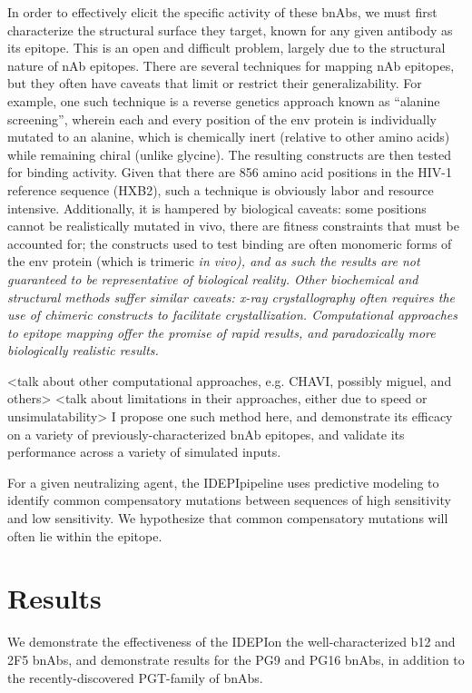 \documentclass[10pt]{article}
\newcommand{\idepi}{{IDEPI}}
\begin{document}
In order to effectively elicit the specific activity of these bnAbs,
we must first characterize the structural surface they target,
known for any given antibody as its epitope.
This is an open and difficult problem, largely due to the structural nature of nAb epitopes.
There are several techniques for mapping nAb epitopes, but they often have caveats that limit or restrict their generalizability.
For example, one such technique is a reverse genetics approach known as “alanine screening”,
wherein each and every position of the env protein is individually mutated to an alanine,
which is chemically inert (relative to other amino acids) while remaining chiral (unlike glycine).
The resulting constructs are then tested for binding activity.
Given that there are 856 amino acid positions in the HIV-1 reference sequence ({HXB2}),
such a technique is obviously labor and resource intensive.
Additionally, it is hampered by biological caveats: some positions cannot be realistically mutated in vivo,
there are fitness constraints that must be accounted for;
the constructs used to test binding are often monomeric forms of the env protein (which is trimeric \em{in vivo}),
and as such the results are not guaranteed to be representative of biological reality.
Other biochemical and structural methods suffer similar caveats:
x-ray crystallography often requires the use of chimeric constructs to facilitate crystallization.
Computational approaches to epitope mapping offer the promise of rapid results,
and paradoxically more biologically realistic results.

<talk about other computational approaches, e.g. CHAVI, possibly miguel, and others>
<talk about limitations in their approaches, either due to speed or unsimulatability> I propose one such method here, and demonstrate its efficacy on a variety of previously-characterized bnAb epitopes, and validate its performance across a variety of simulated inputs.

For a given neutralizing agent,
the \idepi pipeline uses predictive modeling to identify common compensatory mutations between sequences of high sensitivity and low sensitivity.
We hypothesize that common compensatory mutations will often lie within the epitope.

\section*{Results}

We demonstrate the effectiveness of the \idepi on the well-characterized b12 and 2F5 bnAbs,
and demonstrate results for the PG9 and PG16 bnAbs,
in addition to the recently-discovered PGT-family of bnAbs.
\end{document}
